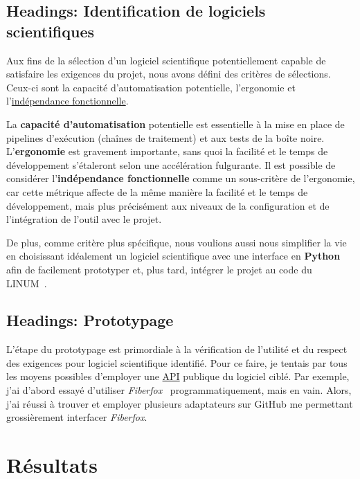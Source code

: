 \documentclass{article}
\begin{document}
  \subsection{Headings: Identification de logiciels scientifiques}
  \label{subsec:headings:software-search}

  Aux fins de la sélection d'un logiciel scientifique potentiellement capable de satisfaire les exigences du projet, nous avons défini des critères de sélections.
  Ceux-ci sont la capacité d'automatisation potentielle, l'ergonomie et l'\href{https://fr.wikipedia.org/wiki/Ind%C3%A9pendance_fonctionnelle}{indépendance
  fonctionnelle}.

  La \textbf{capacité d'automatisation} potentielle est essentielle à la mise en place de pipelines d'exécution (chaînes de traitement) et aux tests de la boîte noire.
  L'\textbf{ergonomie} est gravement importante, sans quoi la facilité et le temps de développement s'étaleront selon une accélération fulgurante.
  Il est possible de considérer l'\textbf{indépendance fonctionnelle} comme un sous-critère de l'ergonomie, car cette métrique affecte de la même manière la facilité
  et le temps de développement, mais plus précisément aux niveaux de la configuration et de l'intégration de l'outil avec le projet.

  De plus, comme critère plus spécifique, nous voulions aussi nous simplifier la vie en choisissant idéalement un logiciel scientifique avec une interface en
  \textbf{Python} afin de facilement prototyper et, plus tard, intégrer le projet au code du LINUM~.

  \subsection{Headings: Prototypage}
  \label{subsec:headings:prototyping}

  L'étape du prototypage est primordiale à la vérification de l'utilité et du respect des exigences pour logiciel scientifique identifié.
  Pour ce faire, je tentais par tous les moyens possibles d'employer une \href{https://fr.wikipedia.org/wiki/Interface_de_programmation}{API} publique du logiciel ciblé.
  Par exemple, j'ai d'abord essayé d'utiliser \textit{Fiberfox}~\citep{neher2014fiberfox} programmatiquement, mais en vain.
  Alors, j'ai réussi à trouver et employer plusieurs adaptateurs sur GitHub me permettant grossièrement interfacer \textit{Fiberfox}.


  \section{Résultats}
  \label{sec:results}
\end{document}
